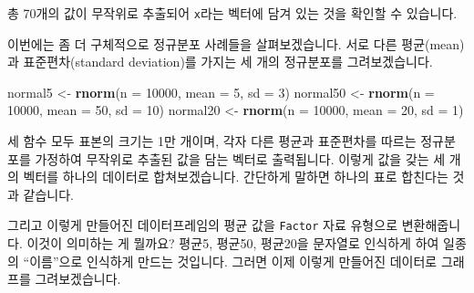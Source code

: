 \documentclass[]{book}
\newenvironment{Shaded}{\begin{snugshade}}{\end{snugshade}}
\newcommand{\DataTypeTok}[1]{\textcolor[rgb]{0.13,0.29,0.53}{#1}}
\newcommand{\DecValTok}[1]{\textcolor[rgb]{0.00,0.00,0.81}{#1}}
\newcommand{\KeywordTok}[1]{\textcolor[rgb]{0.13,0.29,0.53}{\textbf{#1}}}
\newcommand{\NormalTok}[1]{#1}
\newcommand{\OperatorTok}[1]{\textcolor[rgb]{0.81,0.36,0.00}{\textbf{#1}}}
\newcommand{\StringTok}[1]{\textcolor[rgb]{0.31,0.60,0.02}{#1}}
\begin{document}
총 70개의 값이 무작위로 추출되어 \texttt{x}라는 벡터에 담겨 있는 것을 확인할 수 있습니다.

이번에는 좀 더 구체적으로 정규분포 사례들을 살펴보겠습니다. 서로 다른 평균(mean)과 표준편차(standard deviation)를 가지는 세 개의 정규분포를 그려보겠습니다.

\begin{Shaded}
\begin{Highlighting}[]
\NormalTok{normal5 <-}\StringTok{ }\KeywordTok{rnorm}\NormalTok{(}\DataTypeTok{n =} \DecValTok{10000}\NormalTok{, }\DataTypeTok{mean =} \DecValTok{5}\NormalTok{, }\DataTypeTok{sd =} \DecValTok{3}\NormalTok{)}
\NormalTok{normal50 <-}\StringTok{ }\KeywordTok{rnorm}\NormalTok{(}\DataTypeTok{n =} \DecValTok{10000}\NormalTok{, }\DataTypeTok{mean =} \DecValTok{50}\NormalTok{, }\DataTypeTok{sd =} \DecValTok{10}\NormalTok{)}
\NormalTok{normal20 <-}\StringTok{ }\KeywordTok{rnorm}\NormalTok{(}\DataTypeTok{n =} \DecValTok{10000}\NormalTok{, }\DataTypeTok{mean =} \DecValTok{20}\NormalTok{, }\DataTypeTok{sd =} \DecValTok{1}\NormalTok{)}
\end{Highlighting}
\end{Shaded}

세 함수 모두 표본의 크기는 1만 개이며, 각자 다른 평균과 표준편차를 따르는 정규분포를 가정하여 무작위로 추출된 값을 담는 벡터로 출력됩니다. 이렇게 값을 갖는 세 개의 벡터를 하나의 데이터로 합쳐보겠습니다. 간단하게 말하면 하나의 표로 합친다는 것과 같습니다.

\begin{Shaded}
\end{Shaded}

그리고 이렇게 만들어진 데이터프레임의 평균 값을 \texttt{Factor} 자료 유형으로 변환해줍니다. 이것이 의미하는 게 뭘까요? 평균5, 평균50, 평균20을 문자열로 인식하게 하여 일종의 ``이름''으로 인식하게 만드는 것입니다. 그러면 이제 이렇게 만들어진 데이터로 그래프를 그려보겠습니다.
\end{document}
